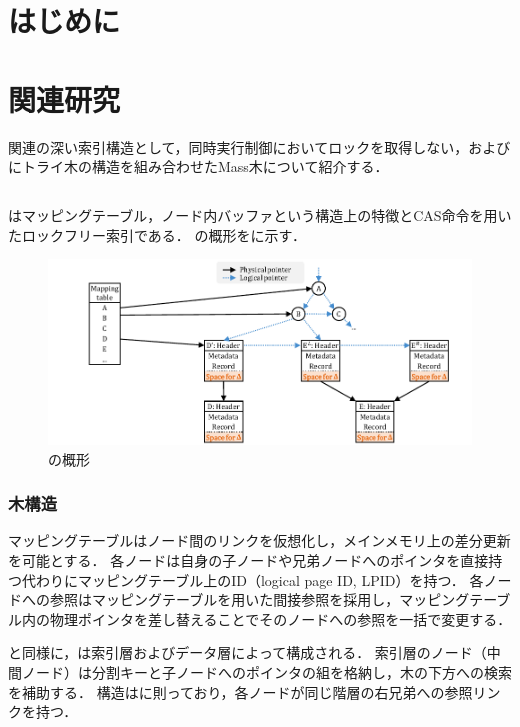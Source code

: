 
\section{はじめに}

\section{関連研究}
\label{sec:relatedwork}
関連の深い索引構造として，同時実行制御においてロックを取得しない\Bctree{}，および\Bptree{}にトライ木の構造を組み合わせたMass木について紹介する．

\subsection{\Bctree{}}
\Bctree{}はマッピングテーブル，ノード内バッファという構造上の特徴とCAS命令を用いたロックフリー索引である．
\Bctree{}の概形を\Fig{\ref{fig:bc_tree-structure}}に示す．

\begin{figure}[t]
    \centering
    \includegraphics{./figures/Bc-structure.pdf}
    \caption{\Bctree{}の概形}
    \label{fig:bc_tree-structure}
\end{figure}

\subsubsection{木構造}
マッピングテーブルはノード間のリンクを仮想化し，メインメモリ上の差分更新を可能とする．
各ノードは自身の子ノードや兄弟ノードへのポインタを直接持つ代わりにマッピングテーブル上のID（logical page ID, LPID）を持つ．
各ノードへの参照はマッピングテーブルを用いた間接参照を採用し，マッピングテーブル内の物理ポインタを差し替えることでそのノードへの参照を一括で変更する．

\Bptree{}と同様に，\Bctree{}は索引層およびデータ層によって構成される．
索引層のノード（中間ノード）は分割キーと子ノードへのポインタの組を格納し，木の下方への検索を補助する．
構造は\Blinktree{}に則っており，各ノードが同じ階層の右兄弟への参照リンクを持つ．

